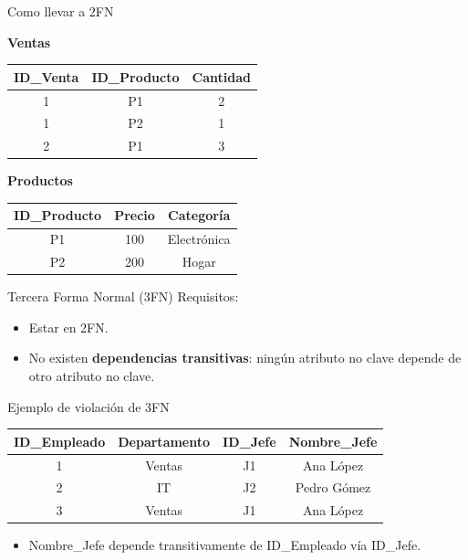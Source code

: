 \documentclass{beamer}
\begin{document}
\begin{frame}{Como llevar a 2FN}
    \begin{center}
        \textbf{Ventas}\\[0.1cm]
        \small
        \begin{tabular}{ccc}
            \hline
            ID\_Venta & ID\_Producto & Cantidad \\
            \hline
            1 & P1 & 2 \\
            1 & P2 & 1 \\
            2 & P1 & 3 \\
            \hline
        \end{tabular}
        \vspace{0.5cm}

        \textbf{Productos}\\[0.1cm]
        \small
        \begin{tabular}{ccc}
            \hline
            ID\_Producto & Precio & Categoría \\
            \hline
            P1 & 100 & Electrónica \\
            P2 & 200 & Hogar \\
            \hline
        \end{tabular}
    \end{center}
\end{frame}

\begin{frame}{Tercera Forma Normal (3FN)}
    Requisitos:
    \begin{itemize}
        \item Estar en 2FN.
        \item No existen \textbf{dependencias transitivas}: ningún atributo no clave depende de otro atributo no clave.
    \end{itemize}
\end{frame}

\begin{frame}{Ejemplo de violación de 3FN}
    \small
    \begin{center}
    \begin{tabular}{cccc}
        \hline
        ID\_Empleado & Departamento & ID\_Jefe & Nombre\_Jefe \\
        \hline
        1 & Ventas & J1 & Ana López \\
        2 & IT & J2 & Pedro Gómez \\
        3 & Ventas & J1 & Ana López \\
        \hline
    \end{tabular}
    \end{center}
    \vspace{0.4cm}
    \begin{center}
        \begin{itemize}
            \item Nombre\_Jefe depende transitivamente de ID\_Empleado vía ID\_Jefe.
        \end{itemize}
    \end{center}
\end{frame}
\end{document}
